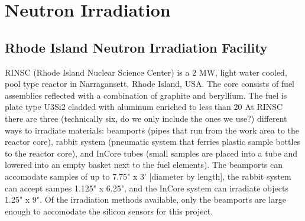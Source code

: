\section{Neutron Irradiation}
\label{sec:irradiation}

\subsection{Rhode Island Neutron Irradiation Facility}
\label{subsec:RINSC}
RINSC (Rhode Island Nuclear Science Center) is a 2 MW, light water cooled, pool type reactor in Narragansett, Rhode Island, USA.
The core consists of fuel assemblies reflected with a combination of graphite and beryllium.
The fuel is plate type U3Si2 cladded with aluminum enriched to less than 20%
At RINSC there are three (technically six, do we only include the ones we use?) different ways to irradiate materials: beamports (pipes that run from the work area to the reactor core), rabbit system (pneumatic system that ferries plastic sample bottles to the reactor core), and InCore tubes (small samples are placed into a tube and lowered into an empty basket next to the fuel elements). 
The beamports can accomodate samples of up to 7.75" x 3' [diameter by length], the rabbit system can accept sampes 1.125" x 6.25", and the InCore system can irradiate objects 1.25" x 9". 
Of the irradiation methods available, only the beamports are large enough to accomodate the silicon sensors for this project.

